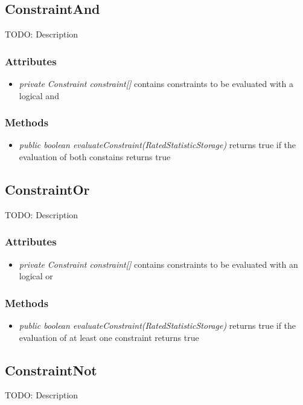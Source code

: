 \subsection{ConstraintAnd }
TODO: Description

\subsubsection{Attributes}
\begin{itemize}
	\item \textit{ private  Constraint constraint[] }
	contains constraints to be evaluated with a logical and	
\end{itemize}
\subsubsection{Methods}
\begin{itemize}
	\item \textit{ public boolean evaluateConstraint(RatedStatisticStorage) }
	returns true if the evaluation of both constains returns true
\end{itemize}


\subsection{ConstraintOr }
TODO: Description

\subsubsection{Attributes}
\begin{itemize}
	\item \textit{ private Constraint constraint[] }
	contains constraints to be evaluated with an logical or
\end{itemize}
\subsubsection{Methods}
\begin{itemize}
	\item \textit{ public boolean evaluateConstraint(RatedStatisticStorage) }
	returns true if the evaluation of at least one constraint returns true
\end{itemize}


\subsection{ConstraintNot }
TODO: Description

